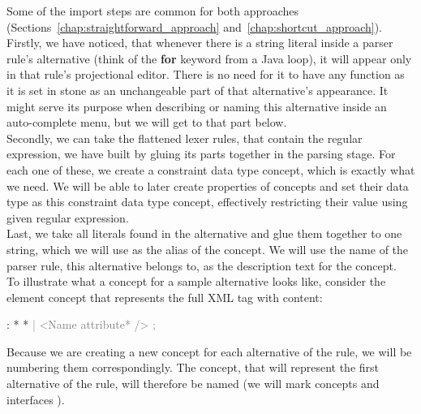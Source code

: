 Some of the import steps are common for both approaches (Sections~\ref{chap:straightforward_approach} and~\ref{chap:shortcut_approach}).
\\

Firstly, we have noticed, that whenever there is a string literal inside a parser rule's alternative (think of the \textbf{for} keyword from a Java loop), it will appear only in that rule's projectional editor.
There is no need for it to have any function as it is set in stone as an unchangeable part of that alternative's appearance.
It might serve its purpose when describing or naming this alternative inside an auto-complete menu, but we will get to that part below.
\\

Secondly, we can take the flattened lexer rules, that contain the regular expression, we have built by gluing its parts together in the parsing stage.
For each one of these, we create a constraint data type concept, which is exactly what we need.
We will be able to later create properties of concepts and set their data type as this constraint data type concept, effectively restricting their value using given regular expression.
\\

Last, we take all literals found in the alternative and glue them together to one string, which we will use as the alias of the concept.
We will use the name of the parser rule, this alternative belongs to, as the description text for the concept.
\\

To illustrate what a concept for a sample alternative looks like, consider the element concept that represents the full XML tag with content:

\begin{antlr}
	      :   \literal{<}  * \literal{>} * \literal{</}  \literal{>}
             \textcolor{gray}{|   \ap<\ap Name attribute* \ap/>\ap}
             \textcolor{gray}{;}
\end{antlr}

Because we are creating a new concept for each alternative of the rule, we will be numbering them correspondingly.
The concept, that will represent the first alternative of the  rule, will therefore be named 
(we will mark concepts  and interfaces ).


